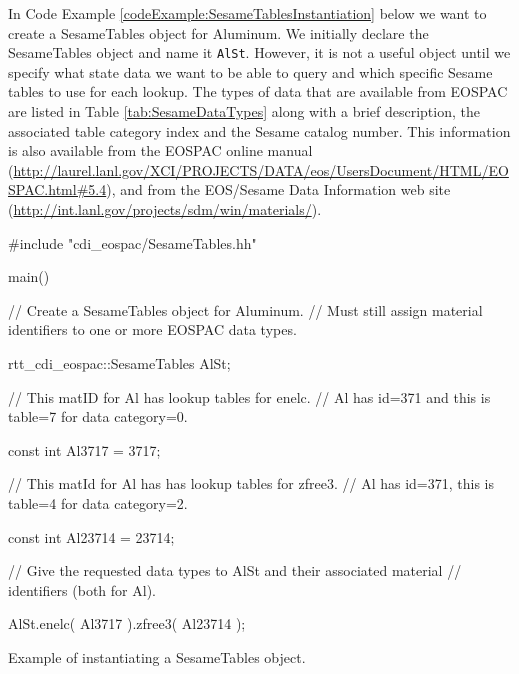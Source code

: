 \documentclass[11pt]{nmemo}
\newenvironment{codeExample}
{\footnotesize 
  \VerbatimEnvironment
  \begin{SaveVerbatim}{\mycode}}%
  {\end{SaveVerbatim}%
  \noindent%
  \parashade[.950]{sharpcorners}{\gdef\outlineboxwidth{.5}%
    \UseVerbatim{\mycode}}\normalsize}
\begin{document}
In Code Example \ref{codeExample:SesameTablesInstantiation} below we
want to create a SesameTables object for Aluminum.  We initially
declare the SesameTables object and name it \texttt{AlSt}.  However,
it is not a useful object until we specify what state data we want to
be able to query and which specific Sesame tables to use for each
lookup.  The types of data that are available from EOSPAC are listed
in Table \ref{tab:SesameDataTypes} along with a brief description, the
associated table category index and the Sesame catalog number.  This
information is also available from the EOSPAC online manual
(\url{http://laurel.lanl.gov/XCI/PROJECTS/DATA/eos/UsersDocument/HTML/EOSPAC.html#5.4}),
and from the EOS/Sesame Data Information web site
(\url{http://int.lanl.gov/projects/sdm/win/materials/}).

\begin{cxxSampleCode}
\begin{codeExample}
#include "cdi_eospac/SesameTables.hh"

main()
{
  // Create a SesameTables object for Aluminum.
  // Must still assign material identifiers to one or more EOSPAC data types.
  
  rtt_cdi_eospac::SesameTables AlSt;
  
  // This matID for Al has lookup tables for enelc. 
  // Al has id=371 and this is table=7 for data category=0.

  const int Al3717 = 3717;
  
  // This matId for Al has has lookup tables for zfree3.  
  // Al has id=371, this is table=4 for data category=2.
  
  const int Al23714 = 23714;

 // Give the requested data types to AlSt and their associated material 
 // identifiers (both for Al).

  AlSt.enelc( Al3717 ).zfree3( Al23714 );
}
\end{codeExample}
\caption{Example of instantiating a SesameTables object.}
\label{codeExample:SesameTablesInstantiation}
\end{cxxSampleCode}
\end{document}
